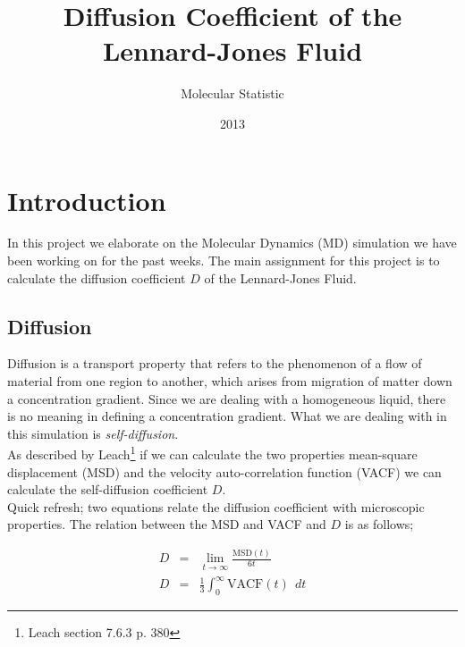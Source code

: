 \documentclass{article}
\title{Diffusion Coefficient of the Lennard-Jones Fluid}
\author{Molecular Statistic}
\date{2013}
\begin{document}


\maketitle

\section{Introduction}

In this project we elaborate on the Molecular Dynamics (MD)
simulation we have been working on for the past weeks.
The main assignment for this project is to calculate the
diffusion coefficient $D$ of the Lennard-Jones Fluid.\\




\subsection{Diffusion}

Diffusion is a transport property that refers to the phenomenon
of a flow of material from one region to another,
which arises from migration of matter down a concentration gradient.
Since we are dealing with a homogeneous liquid, there is no
meaning in defining a concentration gradient.
What we are dealing with
in this simulation is {\em self-diffusion}.\\

As described by Leach\footnote{Leach section 7.6.3 p. 380}
if we can calculate the two properties
mean-square displacement (MSD)
and the velocity auto-correlation function (VACF)
we can calculate the self-diffusion coefficient $D$.\\

Quick refresh;
two equations relate the diffusion coefficient with microscopic properties.
The relation between the MSD and VACF and $D$ is as follows;

\begin{eqnarray}
    D &=& \lim_{t\rightarrow \infty} \frac{\mathrm{MSD}(t)}{6t}\\
    D &=& \frac{1}{3} \int_0^\infty \mathrm{VACF}(t) \ \ dt
\end{eqnarray}
\end{document}
